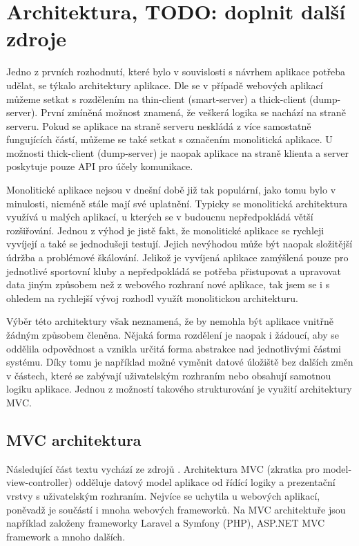 \section{Architektura, TODO: doplnit další zdroje}
Jedno z prvních rozhodnutí, které bylo v souvislosti s návrhem aplikace potřeba udělat, se týkalo architektury aplikace. Dle \cite{twa_architecture} se v případě webových aplikací můžeme setkat s rozdělením na thin-client (smart-server) a thick-client (dump-server). První zmíněná možnost znamená, že veškerá logika se nachází na straně serveru. Pokud se aplikace na straně serveru neskládá z více samostatně fungujících částí, můžeme se také setkat s označením monolitická aplikace. U možnosti thick-client (dump-server) je naopak aplikace na straně klienta a server poskytuje pouze API pro účely komunikace.

Monolitické aplikace nejsou v dnešní době již tak populární, jako tomu bylo v minulosti, nicméně stále mají své uplatnění. Typicky se monolitická architektura využívá u malých aplikací, u kterých se v budoucnu nepředpokládá větší rozšiřování. Jednou z výhod je jistě fakt, že monolitické aplikace se rychleji vyvíjejí a také se jednodušeji testují. Jejich nevýhodou může být naopak složitější údržba a problémové škálování. \cite{twa_architecture} Jelikož je vyvíjená aplikace zamýšlená pouze pro jednotlivé sportovní kluby a nepředpokládá se potřeba přistupovat a upravovat data jiným způsobem než z webového rozhraní nové aplikace, tak jsem se i s ohledem na rychlejší vývoj rozhodl využít monolitickou architekturu.

Výběr této architektury však neznamená, že by nemohla být aplikace vnitřně žádným způsobem členěna. Nějaká forma rozdělení je naopak i žádoucí, aby se oddělila odpovědnost a vznikla určitá forma abstrakce nad jednotlivými částmi systému. Díky tomu je například možné vyměnit datové úložiště bez dalších změn v částech, které se zabývají uživatelským rozhraním nebo obsahují samotnou logiku aplikace. Jednou z možností takového strukturování je využití architektury MVC.

\subsection{MVC architektura}
Následující část textu vychází ze zdrojů \cite{it_network_mvc, mdn_mvc}. Architektura MVC (zkratka pro model-view-controller) odděluje datový model aplikace od řídící logiky a prezentační vrstvy s uživatelským rozhraním. Nejvíce se uchytila u webových aplikací, poněvadž je součástí i mnoha webových frameworků. Na MVC architektuře jsou například založeny frameworky Laravel a Symfony (PHP), ASP.NET MVC framework a mnoho dalších.

